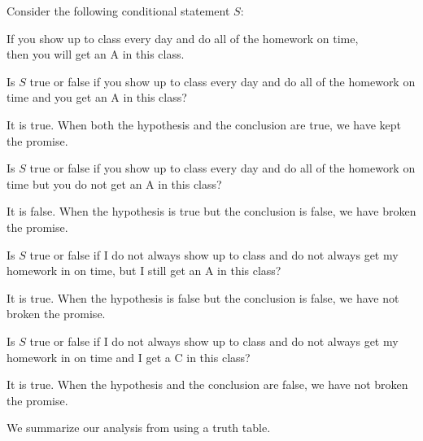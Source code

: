 \begin{exam}
\label{exam_understand_ifthen_true}  
    Consider the following conditional statement $S$:
        \begin{center}
            If you show up to class every day and do all of the homework on time,\\ then you will get an A in this class.
        \end{center}
        \begin{apart}
            \item Is $S$ true or false if you show up to class every day and do all of the homework on time and you get an A in this class?
                \begin{soln}
                    It is true. When both the hypothesis and the conclusion are true, we have kept the promise.
                \end{soln}
            \item Is $S$ true or false if you show up to class every day and do all of the homework on time but you do not get an A in this class?
                \begin{soln}
                    It is false.  When the hypothesis is true but the conclusion is false, we have broken the promise. 
                \end{soln}
            \item Is $S$ true or false if I do not always show up to class and do not always get my homework in on time, but I still get an A in this class? 
                \begin{soln}
                    It is true. When the hypothesis is false but the conclusion is false, we have not broken the promise.
                \end{soln}
            \item Is $S$ true or false if I do not always show up to class and do not always get my homework in on time and I get a C in this class? 
                \begin{soln}
                    It is true. When the hypothesis and the conclusion are false, we have not broken the promise.
                \end{soln}
        \end{apart}
\end{exam}

We summarize our analysis from  using a truth table.

